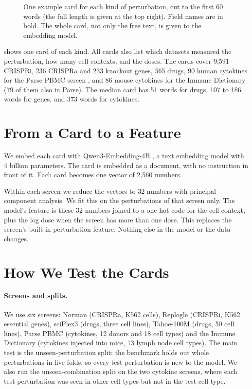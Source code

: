 \documentclass[]{style}
\begin{document}
\begin{figure}[t]
\centering

\caption{One example card for each kind of perturbation, cut to the first 60 words (the full length is given at the top
right). Field names are in bold. The whole card, not only the free text, is given to the embedding model.}
\label{fig:cards}
\end{figure}

 shows one card of each kind. All cards also list which datasets measured the perturbation, how many cell contexts, and the doses. The cards cover
9,591 CRISPRi, 236 CRISPRa and 233 knockout genes, 565 drugs, 90 human cytokines for the Parse PBMC screen
\citep{parsepbmc}, and 86 mouse cytokines for the Immune Dictionary \citep{cui2024} (79 of them also in Parse). The
median card has 51 words for drugs, 107 to 186 words for genes, and 373 words for cytokines.

\section{From a Card to a Feature}

We embed each card with Qwen3-Embedding-4B \citep{qwen3emb}, a text embedding model with 4 billion parameters. The card
is embedded as a document, with no instruction in front of it. Each card becomes one vector of 2,560 numbers.

Within each screen we reduce the vectors to 32 numbers with principal component analysis. We fit this on the
perturbations of that screen only. The model's feature is these 32 numbers joined to a one-hot code for the cell
context, plus the log dose when the screen has more than one dose. This replaces the screen's built-in perturbation
feature. Nothing else in the model or the data changes.

\section{How We Test the Cards}

\paragraph{Screens and splits.} We use six screens: Norman \citep{norman2019} (CRISPRa, K562 cells), Replogle
\citep{replogle2022} (CRISPRi, K562 essential genes), sciPlex3 (drugs, three cell lines), Tahoe-100M (drugs, 50 cell
lines), Parse PBMC (cytokines, 12 donors and 18 cell types) and the Immune Dictionary (cytokines injected into mice,
13 lymph node cell types). The main test is the unseen-perturbation split: the benchmark holds out whole perturbations in
five folds, so every test perturbation is new to the model. We also run the unseen-combination split on the two cytokine
screens, where each test perturbation was seen in other cell types but not in the test cell type.
\end{document}
